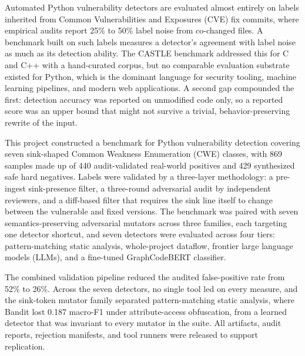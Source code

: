 \vspace{-1cm}
Automated Python vulnerability detectors are evaluated almost entirely on
labels inherited from Common Vulnerabilities and Exposures (CVE) fix commits,
where empirical audits report 25\% to 50\% label noise from co-changed files. A
benchmark built on such labels measures a detector's agreement with label noise
as much as its detection ability. The CASTLE benchmark addressed this for C and
C++ with a hand-curated corpus, but no comparable evaluation substrate existed
for Python, which is the dominant language for security tooling, machine
learning pipelines, and modern web applications. A second gap compounded the
first: detection accuracy was reported on unmodified code only, so a reported
score was an upper bound that might not survive a trivial, behavior-preserving
rewrite of the input.

This project constructed a benchmark for Python vulnerability detection covering
seven sink-shaped Common Weakness Enumeration (CWE) classes, with 869 samples
made up of 440 audit-validated real-world positives and 429 synthesized safe
hard negatives. Labels were validated by a three-layer methodology: a pre-ingest
sink-presence filter, a three-round adversarial audit by independent reviewers,
and a diff-based filter that requires the sink line itself to change between the
vulnerable and fixed versions. The benchmark was paired with seven
semantics-preserving adversarial mutators across three families, each targeting
one detector shortcut, and seven detectors were evaluated across four tiers:
pattern-matching static analysis, whole-project dataflow, frontier large
language models (LLMs), and a fine-tuned GraphCodeBERT classifier.

The combined validation pipeline reduced the audited false-positive rate from
52\% to 26\%. Across the seven detectors, no single tool led on every measure,
and the sink-token mutator family separated pattern-matching static analysis,
where Bandit lost 0.187 macro-F1 under attribute-access obfuscation,
from a learned detector that was invariant to every mutator in the suite. All
artifacts, audit reports, rejection manifests, and tool runners were released to
support replication.

\pagebreak